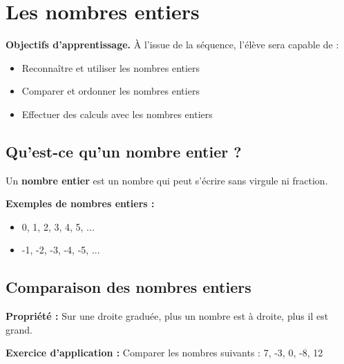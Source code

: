 \chapter{Les nombres entiers}

\begin{objectifsbox}
\textbf{Objectifs d'apprentissage.} À l'issue de la séquence, l'élève sera capable de :
\begin{itemize}
\item Reconnaître et utiliser les nombres entiers
\item Comparer et ordonner les nombres entiers
\item Effectuer des calculs avec les nombres entiers
\end{itemize}
\end{objectifsbox}

\section{Qu'est-ce qu'un nombre entier ?}

\begin{definitionbox}
Un \textbf{nombre entier} est un nombre qui peut s'écrire sans virgule ni fraction.
\end{definitionbox}

\begin{examplebox}
\textbf{Exemples de nombres entiers :}
\begin{itemize}
\item 0, 1, 2, 3, 4, 5, ...
\item -1, -2, -3, -4, -5, ...
\end{itemize}
\end{examplebox}

\section{Comparaison des nombres entiers}

\begin{proprietebox}
\textbf{Propriété :} Sur une droite graduée, plus un nombre est à droite, plus il est grand.
\end{proprietebox}

\begin{exercisebox}
\textbf{Exercice d'application :}
Comparer les nombres suivants : 7, -3, 0, -8, 12
\end{exercisebox}
